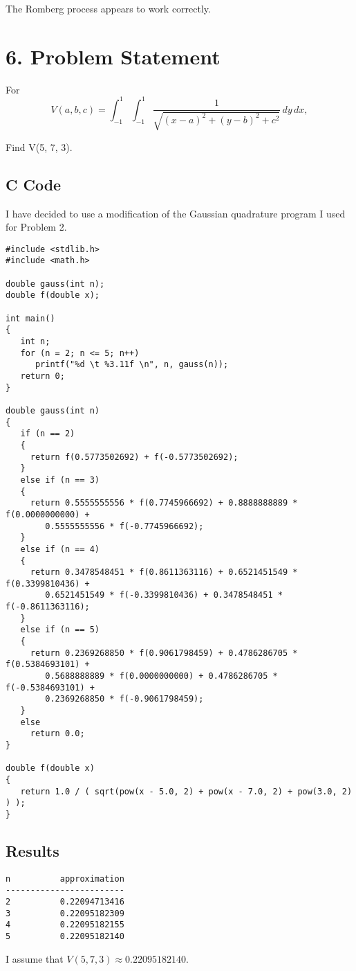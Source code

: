 \documentclass{article}
\begin{document}
The Romberg process appears to work correctly.




\section*{6.   Problem Statement}
For 
$$
V(a, b, c) = \int_{-1}^{1} \int_{-1}^{1}
                   \frac{1}{ \sqrt{(x - a)^2 + (y - b)^2 + c^2} } \, dy \, dx,
$$

Find V(5, 7, 3).

\subsection*{C Code}
I have decided to use a modification of the Gaussian quadrature program I used 
for Problem 2.

\begin{verbatim}
#include <stdlib.h>
#include <math.h>

double gauss(int n);
double f(double x);

int main()
{  
   int n;
   for (n = 2; n <= 5; n++)
      printf("%d \t %3.11f \n", n, gauss(n));
   return 0;
}

double gauss(int n)
{
   if (n == 2)
   {
     return f(0.5773502692) + f(-0.5773502692);
   }
   else if (n == 3)
   {
     return 0.5555555556 * f(0.7745966692) + 0.8888888889 * f(0.0000000000) + 
	    0.5555555556 * f(-0.7745966692);
   }
   else if (n == 4)
   {
     return 0.3478548451 * f(0.8611363116) + 0.6521451549 * f(0.3399810436) + 
	    0.6521451549 * f(-0.3399810436) + 0.3478548451 * f(-0.8611363116);
   }
   else if (n == 5)
   {
     return 0.2369268850 * f(0.9061798459) + 0.4786286705 * f(0.5384693101) +
	    0.5688888889 * f(0.0000000000) + 0.4786286705 * f(-0.5384693101) +
	    0.2369268850 * f(-0.9061798459);
   }
   else
     return 0.0;
}

double f(double x)
{
   return 1.0 / ( sqrt(pow(x - 5.0, 2) + pow(x - 7.0, 2) + pow(3.0, 2) ) );
}
\end{verbatim}

\subsection*{Results}

\begin{verbatim}
n          approximation
------------------------
2          0.22094713416
3          0.22095182309
4          0.22095182155
5          0.22095182140
\end{verbatim}

I assume that $V(5, 7, 3) \approx 0.22095182140$.
\end{document}
